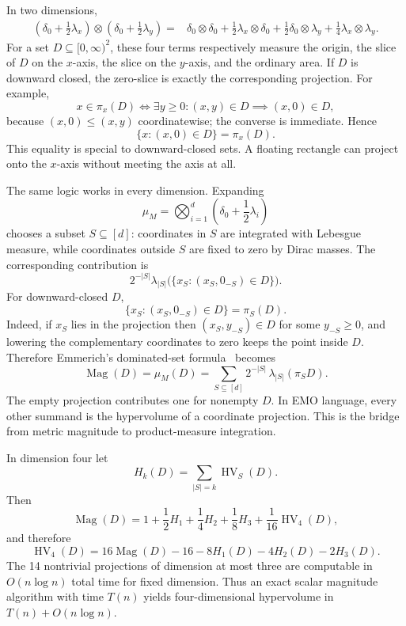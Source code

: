 \documentclass[12pt,a4paper]{article}
\theoremstyle{definition}
\newcommand{\HV}{\operatorname{HV}}
\newcommand{\Mag}{\operatorname{Mag}}
\newcommand{\1}{\mathbf 1}
\begin{document}
In two dimensions,
\begin{align}
\left(\delta_0+\tfrac12\lambda_x\right)\otimes
\left(\delta_0+\tfrac12\lambda_y\right)
={}&\delta_0\otimes\delta_0
 +\tfrac12\lambda_x\otimes\delta_0
 +\tfrac12\delta_0\otimes\lambda_y
 +\tfrac14\lambda_x\otimes\lambda_y.                 \label{eq:dirac2d}
\end{align}
For a set $D\subseteq[0,\infty)^2$, these four terms respectively measure the origin, the slice of $D$ on the $x$-axis, the slice on the $y$-axis, and the ordinary area. If $D$ is downward closed, the zero-slice is exactly the corresponding projection. For example,
\[
x\in\pi_x(D)
\iff \exists y\ge0:(x,y)\in D
\implies (x,0)\in D,
\]
because $(x,0)\le(x,y)$ coordinatewise; the converse is immediate. Hence
\[
\{x:(x,0)\in D\}=\pi_x(D).
\]
This equality is special to downward-closed sets. A floating rectangle can project onto the $x$-axis without meeting the axis at all.

The same logic works in every dimension. Expanding
\begin{equation}
\mu_M=\bigotimes_{i=1}^d\left(\delta_0+\frac12\lambda_i\right)             \label{eq:magmeasure}
\end{equation}
chooses a subset $S\subseteq[d]$: coordinates in $S$ are integrated with Lebesgue measure, while coordinates outside $S$ are fixed to zero by Dirac masses. The corresponding contribution is
\[
2^{-|S|}\lambda_{|S|}\bigl(\{x_S:(x_S,0_{-S})\in D\}\bigr).
\]
For downward-closed $D$,
\begin{equation}
\boxed{\{x_S:(x_S,0_{-S})\in D\}=\pi_S(D).}                 \label{eq:sliceprojection}
\end{equation}
Indeed, if $x_S$ lies in the projection then $(x_S,y_{-S})\in D$ for some $y_{-S}\ge0$, and lowering the complementary coordinates to zero keeps the point inside $D$. Therefore Emmerich's dominated-set formula~\cite{Emmerich2026} becomes
\begin{equation}
\boxed{\Mag(D)=\mu_M(D)=\sum_{S\subseteq[d]}2^{-|S|}\,\lambda_{|S|}(\pi_S D).}   \label{eq:projection}
\end{equation}
The empty projection contributes one for nonempty $D$. In EMO language, every other summand is the hypervolume of a coordinate projection. This is the bridge from metric magnitude to product-measure integration.

In dimension four let
\[
H_k(D)=\sum_{|S|=k}\HV_S(D).
\]
Then
\begin{equation}
\Mag(D)=1+\frac12H_1+\frac14H_2+\frac18H_3+\frac1{16}\HV_4(D),      \label{eq:mag4}
\end{equation}
and therefore
\begin{equation}
\boxed{\HV_4(D)=16\Mag(D)-16-8H_1(D)-4H_2(D)-2H_3(D).}             \label{eq:recoverHV}
\end{equation}
The 14 nontrivial projections of dimension at most three are computable in $O(n\log n)$ total time for fixed dimension. Thus an exact scalar magnitude algorithm with time $T(n)$ yields four-dimensional hypervolume in $T(n)+O(n\log n)$.
\end{document}
